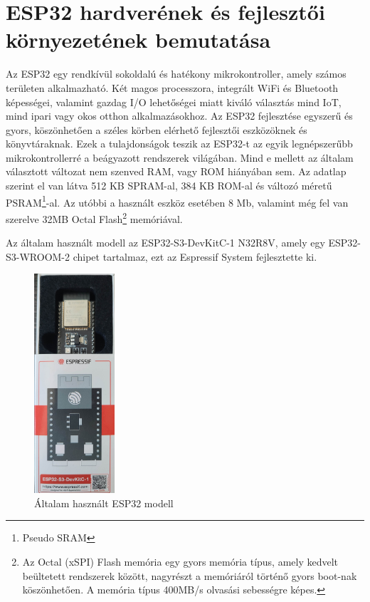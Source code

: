 \documentclass{thesis-ekf}
\theoremstyle{definition}
\theoremstyle{remark}
\begin{document}
	\section{ESP32 hardverének és fejlesztői környezetének bemutatása}
	\label{se_espB}
	Az ESP32 egy rendkívül sokoldalú és hatékony mikrokontroller, amely számos területen alkalmazható. Két magos processzora, integrált WiFi és Bluetooth képességei, valamint gazdag I/O lehetőségei miatt kiváló választás mind IoT, mind ipari vagy okos otthon alkalmazásokhoz. Az ESP32 fejlesztése egyszerű és gyors, köszönhetően a széles körben elérhető fejlesztői eszközöknek és könyvtáraknak. Ezek a tulajdonságok teszik az ESP32-t az egyik legnépszerűbb mikrokontrollerré a beágyazott rendszerek világában. Mind e mellett az általam választott változat nem szenved RAM, vagy ROM hiányában sem. Az adatlap szerint el van látva 512 KB SPRAM-al, 384 KB ROM-al és változó méretű PSRAM\footnote{Pseudo SRAM}-al. Az utóbbi a használt eszköz esetében 8 Mb, valamint még fel van szerelve 32MB Octal Flash\footnote{Az Octal (xSPI) Flash memória egy gyors memória típus, amely kedvelt beültetett rendszerek között, nagyrészt a memóriáról történő gyors boot-nak köszönhetően. A memória típus 400MB/s olvasási sebességre képes.\cite{bib_esp_octal}} memóriával.
	
	
	Az általam  használt modell az ESP32-S3-DevKitC-1 N32R8V, amely egy ESP32-S3-WROOM-2 chipet tartalmaz, ezt az Espressif System fejlesztette ki.
	\begin{figure}[!ht]
		\centering
		\includegraphics[width=3cm]{MyESP32}
		\caption{Általam használt ESP32 modell}
		\label{img_myesp}
	\end{figure}
	
\end{document}
